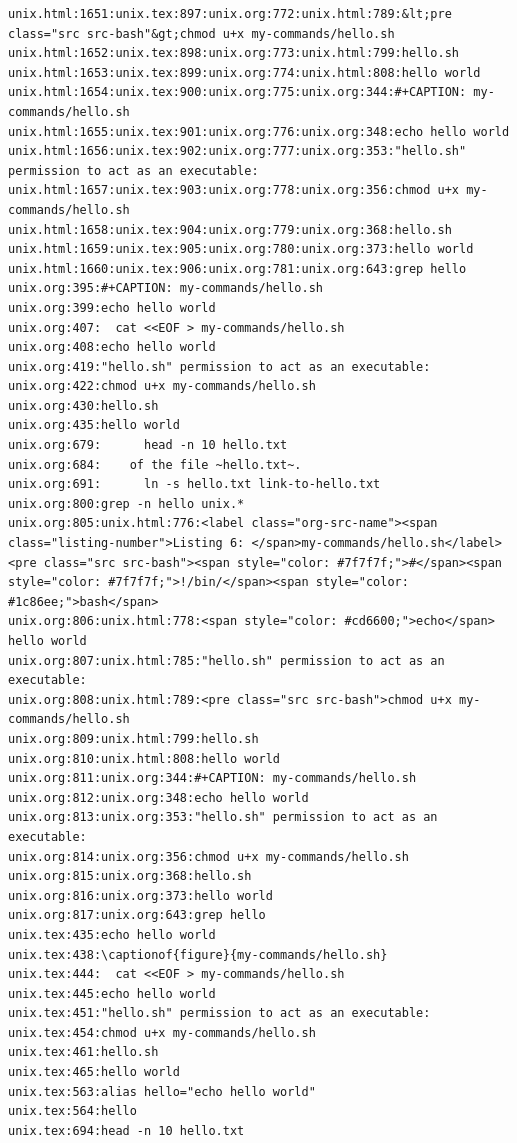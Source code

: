 \documentclass[11pt]{article}
\begin{document}
\begin{verbatim}
unix.html:1651:unix.tex:897:unix.org:772:unix.html:789:&lt;pre class="src src-bash"&gt;chmod u+x my-commands/hello.sh
unix.html:1652:unix.tex:898:unix.org:773:unix.html:799:hello.sh
unix.html:1653:unix.tex:899:unix.org:774:unix.html:808:hello world
unix.html:1654:unix.tex:900:unix.org:775:unix.org:344:#+CAPTION: my-commands/hello.sh
unix.html:1655:unix.tex:901:unix.org:776:unix.org:348:echo hello world
unix.html:1656:unix.tex:902:unix.org:777:unix.org:353:"hello.sh" permission to act as an executable:
unix.html:1657:unix.tex:903:unix.org:778:unix.org:356:chmod u+x my-commands/hello.sh
unix.html:1658:unix.tex:904:unix.org:779:unix.org:368:hello.sh
unix.html:1659:unix.tex:905:unix.org:780:unix.org:373:hello world
unix.html:1660:unix.tex:906:unix.org:781:unix.org:643:grep hello 
unix.org:395:#+CAPTION: my-commands/hello.sh
unix.org:399:echo hello world
unix.org:407:  cat <<EOF > my-commands/hello.sh
unix.org:408:echo hello world
unix.org:419:"hello.sh" permission to act as an executable:
unix.org:422:chmod u+x my-commands/hello.sh
unix.org:430:hello.sh
unix.org:435:hello world
unix.org:679:      head -n 10 hello.txt
unix.org:684:    of the file ~hello.txt~.
unix.org:691:      ln -s hello.txt link-to-hello.txt
unix.org:800:grep -n hello unix.*
unix.org:805:unix.html:776:<label class="org-src-name"><span class="listing-number">Listing 6: </span>my-commands/hello.sh</label><pre class="src src-bash"><span style="color: #7f7f7f;">#</span><span style="color: #7f7f7f;">!/bin/</span><span style="color: #1c86ee;">bash</span>
unix.org:806:unix.html:778:<span style="color: #cd6600;">echo</span> hello world
unix.org:807:unix.html:785:"hello.sh" permission to act as an executable:
unix.org:808:unix.html:789:<pre class="src src-bash">chmod u+x my-commands/hello.sh
unix.org:809:unix.html:799:hello.sh
unix.org:810:unix.html:808:hello world
unix.org:811:unix.org:344:#+CAPTION: my-commands/hello.sh
unix.org:812:unix.org:348:echo hello world
unix.org:813:unix.org:353:"hello.sh" permission to act as an executable:
unix.org:814:unix.org:356:chmod u+x my-commands/hello.sh
unix.org:815:unix.org:368:hello.sh
unix.org:816:unix.org:373:hello world
unix.org:817:unix.org:643:grep hello 
unix.tex:435:echo hello world
unix.tex:438:\captionof{figure}{my-commands/hello.sh}
unix.tex:444:  cat <<EOF > my-commands/hello.sh
unix.tex:445:echo hello world
unix.tex:451:"hello.sh" permission to act as an executable:
unix.tex:454:chmod u+x my-commands/hello.sh
unix.tex:461:hello.sh
unix.tex:465:hello world
unix.tex:563:alias hello="echo hello world"
unix.tex:564:hello
unix.tex:694:head -n 10 hello.txt

\end{verbatim}
\end{document}
